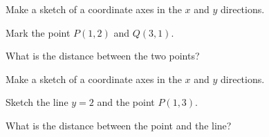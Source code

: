 \begin{problem}
\item Make a sketch of a coordinate axes in the $x$ and $y$ directions.
  \vfill
\begin{subproblem}
  \item Mark the point $P(1,2)$ and $Q(3,1)$.
  \item What is the distance between the two points?
    \vspace{3em}
\end{subproblem}

\item Make a sketch of a coordinate axes in the $x$ and $y$ directions.
  \vfill
\begin{subproblem}
  \item Sketch the line $y=2$ and the point $P(1,3)$.
  \item What is the distance between the point and the line?
    \vspace{3em}
\end{subproblem}


\end{problem}


